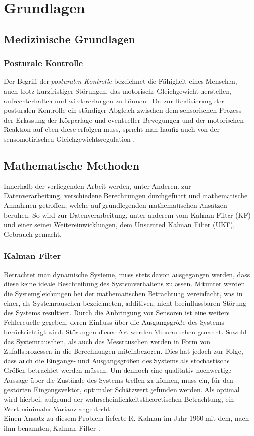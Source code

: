 \chapter{Grundlagen}
\section{Medizinische Grundlagen}
\subsection{Posturale Kontrolle}
Der Begriff der \textit{posturalen Kontrolle} bezeichnet die Fähigkeit eines Menschen, auch trotz kurzfristiger Störungen, das motorische Gleichgewicht herstellen, aufrechterhalten und wiedererlangen zu können \cite{PK1}.
Da zur Realisierung der posturalen Kontrolle ein ständiger Abgleich zwischen dem sensorischen Prozess der Erfassung der Körperlage und eventueller Bewegungen und der motorischen Reaktion auf eben diese erfolgen muss, spricht man häufig auch von der sensomotirischen Gleichgewichtsregulation \cite{PK2}.

\section{Mathematische Methoden}
Innerhalb der vorliegenden Arbeit werden, unter Anderem zur Datenverarbeitung, verschiedene Berechnungen durchgeführt und mathematische Annahmen getroffen, welche auf grundlegenden mathematischen Ansätzen beruhen.
So wird zur Datenverarbeitung, unter anderem vom Kalman Filter (KF) und einer seiner Weitereinwicklungen, dem Unscented Kalman Filter (UKF), Gebrauch gemacht.

\subsection{Kalman Filter}
Betrachtet man dynamische Systeme, muss stets davon ausgegangen werden, dass diese keine ideale Beschreibung des Systemverhaltens zulassen.
Mitunter werden die Systemgleichungen bei der mathematischen Betrachtung vereinfacht, was in einer, als Systemrauschen bezeichneten, additiven, nicht beeinflussbaren Störung des Systems resultiert.
Durch die Anbringung von Sensoren ist eine weitere Fehlerquelle gegeben, deren Einfluss über die Ausgangsgröße des Systems berücksichtigt wird. Störungen dieser Art werden Messrauschen genannt.
Sowohl das Systemrauschen, als auch das Messrauschen werden in Form von Zufallsprozessen in die Berechnungen miteinbezogen. Dies hat jedoch zur Folge, dass auch die Eingangs- und Ausgangsgrößen des Systems als stochastische Größen betrachtet werden müssen.
Um dennoch eine qualitativ hochwertige Aussage über die Zustände des Systems treffen zu können, muss ein, für den gestörten Eingangsvektor, optimaler Schätzwert gefunden werden. Als optimal wird hierbei, aufgrund der wahrscheinlichkeitstheoretischen Betrachtung, ein Wert minimaler Varianz angestrebt. \cite{Sys2}
\\Einen Ansatz zu diesem Problem lieferte R. Kalman im Jahr 1960 mit dem, nach ihm benannten, Kalman Filter \cite{kalman}.

